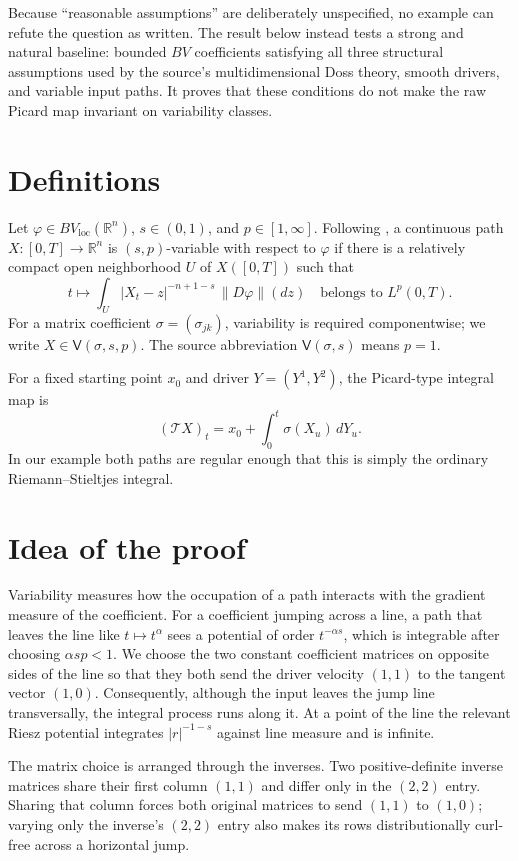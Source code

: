\documentclass[11pt]{article}
\newcommand{\R}{\mathbb{R}}
\newcommand{\BV}{BV_{\mathrm{loc}}}
\newcommand{\V}{\mathsf{V}}
\newcommand{\Tmap}{\mathcal{T}}
\begin{document}
Because ``reasonable assumptions'' are deliberately unspecified, no example
can refute the question as written.  The result below instead tests a strong
and natural baseline: bounded $BV$ coefficients satisfying all three
structural assumptions used by the source's multidimensional Doss theory,
smooth drivers, and variable input paths.  It proves that these conditions do
not make the raw Picard map invariant on variability classes.

\section{Definitions}

Let $\varphi\in \BV(\R^n)$, $s\in(0,1)$, and $p\in[1,\infty]$.  Following
\cite[Definition 2.1]{HTV}, a continuous path $X:[0,T]\to\R^n$ is
$(s,p)$-variable with respect to $\varphi$ if there is a relatively compact
open neighborhood $U$ of $X([0,T])$ such that
\[
 t\longmapsto \int_U |X_t-z|^{-n+1-s}\,\lVert D\varphi\rVert(dz)
 \quad\text{belongs to }L^p(0,T).
\]
For a matrix coefficient $\sigma=(\sigma_{jk})$, variability is required
componentwise; we write $X\in\V(\sigma,s,p)$.  The source abbreviation
$\V(\sigma,s)$ means $p=1$.

For a fixed starting point $x_0$ and driver $Y=(Y^1,Y^2)$, the Picard-type
integral map is
\[
 (\Tmap X)_t=x_0+\int_0^t \sigma(X_u)\,dY_u.
\]
In our example both paths are regular enough that this is simply the ordinary
Riemann--Stieltjes integral.

\section{Idea of the proof}

Variability measures how the occupation of a path interacts with the gradient
measure of the coefficient.  For a coefficient jumping across a line, a path
that leaves the line like $t\mapsto t^\alpha$ sees a potential of order
$t^{-\alpha s}$, which is integrable after choosing $\alpha sp<1$.  We choose
the two constant coefficient matrices on opposite sides of the line so that
they both send the driver velocity $(1,1)$ to the tangent vector $(1,0)$.
Consequently, although the input leaves the jump line transversally, the
integral process runs along it.  At a point of the line the relevant Riesz
potential integrates $|r|^{-1-s}$ against line measure and is infinite.

The matrix choice is arranged through the inverses.  Two positive-definite
inverse matrices share their first column $(1,1)$ and differ only in the
$(2,2)$ entry.  Sharing that column forces both original matrices to send
$(1,1)$ to $(1,0)$; varying only the inverse's $(2,2)$ entry also makes its rows
distributionally curl-free across a horizontal jump.
\end{document}
